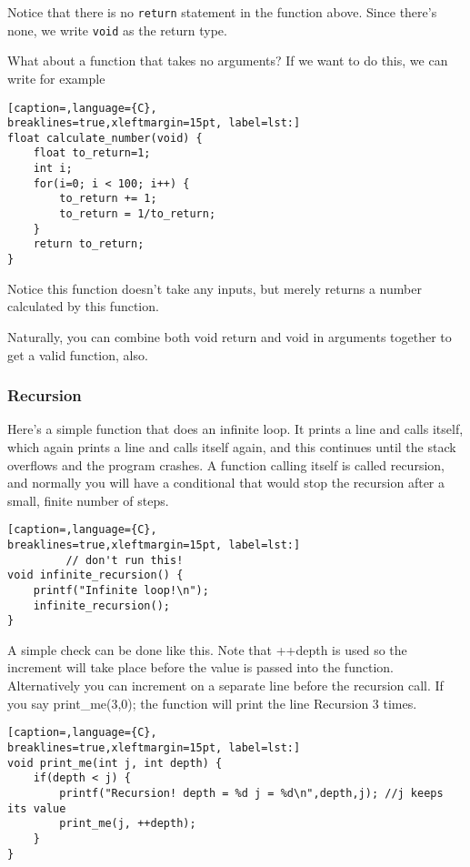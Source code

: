 Notice that there is no \texttt{return} statement in the function above. Since
there's none, we write \texttt{void} as the return type.

What about a function that takes no arguments? If we want to do this, we can
write for example

\lstset{basicstyle=\scriptsize, numbers=left, captionpos=b, tabsize=4}
\begin{lstlisting}[caption=,language={C},
breaklines=true,xleftmargin=15pt, label=lst:]
float calculate_number(void) {
	float to_return=1;
	int i;
	for(i=0; i < 100; i++) {
		to_return += 1;
		to_return = 1/to_return;
	}
	return to_return;
}
\end{lstlisting}

Notice this function doesn't take any inputs, but merely returns a number
calculated by this function.

Naturally, you can combine both void return and void in arguments together to
get a valid function, also.

\subsubsection{Recursion}
Here's a simple function that does an infinite loop. It prints a line and calls
itself, which again prints a line and calls itself again, and this continues
until the stack overflows and the program crashes. A function calling itself is
called recursion, and normally you will have a conditional that would stop the
recursion after a small, finite number of steps.
\begin{lstlisting}[caption=,language={C},
breaklines=true,xleftmargin=15pt, label=lst:]
	     // don't run this!
void infinite_recursion() {
	printf("Infinite loop!\n");
	infinite_recursion();
}
\end{lstlisting}

A simple check can be done like this. Note that ++depth is used so the
increment will take place before the value is passed into the function.
Alternatively you can increment on a separate line before the recursion call.
If you say print\_me(3,0); the function will print the line Recursion 3 times.
\lstset{basicstyle=\scriptsize, numbers=left, captionpos=b, tabsize=4}
\begin{lstlisting}[caption=,language={C},
breaklines=true,xleftmargin=15pt, label=lst:]
void print_me(int j, int depth) {
	if(depth < j) {
	    printf("Recursion! depth = %d j = %d\n",depth,j); //j keeps its value
	    print_me(j, ++depth);
	}
}
\end{lstlisting}

